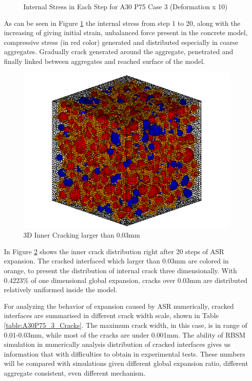 \begin{figure}[ht!]
      

  \caption{Internal Stress in Each Step for A30 P75 Case 3 (Deformation x 10)}
  \label{fig:ASR_A30P75_3_IS}
  \end{figure}

As can be seen in Figure \ref{fig:ASR_A30P75_3_IS} the internal stress from step 1 to 20, along with the increasing of giving initial strain, unbalanced force present in the concrete model, compressive stress (in red color) generated and distributed especially in coarse aggregates. Gradually crack generated around the aggregate, penetrated and finally linked between aggregates and reached surface of the model.

\begin{figure}[ht!]
\centering
\includegraphics[width=.5\linewidth]{Files/exp_3D/ASR/A30P75_3_c.png}
  \caption{3D Inner Cracking larger than 0.03mm}
  \label{fig:A30P75_3_crack}
\end{figure}

In Figure \ref{fig:A30P75_3_crack} shows the inner crack distribution right after 20 steps of ASR expansion. The cracked interfaced which larger than 0.03mm are colored in orange, to present the distribution of internal crack three dimensionally. With 0.4223\% of one dimensional global expansion, cracks over 0.03mm are distributed relatively uniformed inside the model.

For analyzing the behavior of expansion caused by ASR numerically, cracked interfaces are summarised in different crack width scale, shown in Table \ref{table:A30P75_3_Cracks}. The maximum crack width, in this case, is in range of 0.01-0.03mm, while most of the cracks are under 0.001mm. The ability of RBSM simulation in numerically analysis distribution of cracked interfaces gives us information that with difficulties to obtain in experimental tests. These numbers will be compared with simulations given different global expansion ratio, different aggregate consistent, even different mechanism.

